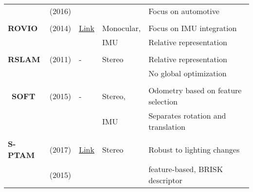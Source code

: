 {\begin{longtable}{l|l|l|l|l}
			& \cite{Buczko2016a} (2016)         &                                                                    &                       & Focus on automotive\\
			&                                   &                                                                    &                       &\\
			\textbf{ROVIO}         & \cite{Bloesch2015} (2014)         & {\href{https://github.com/ethz-asl/rovio}{Link}}                   & Monocular,            & Focus on IMU integration\\
			&                                   &                                                                    & IMU                   & Relative representation\\
			&                                   &                                                                    &                       &\\
			\textbf{RSLAM}         & \cite{Mei2011} (2011)             & -                                                                  & Stereo                & Relative representation\\
			&                                   &                                                                    &                       & No global optimization \\
			&                                   &                                                                    &                       &\\\
			\textbf{SOFT}          & \cite{Cvisic2015} (2015)          & -                                                                  & Stereo,               & Odometry based on feature selection\\
			&                                   &                                                                    & IMU                   & Separates rotation and translation\\
			&                                   &                                                                    &                       &\\
			\textbf{S-PTAM}        & \cite{Pire2017} (2017)            & {\href{https://github.com/lrse/sptam}{Link}}                       & Stereo                & Robust to lighting changes\\
			& \cite{Pire2015} (2015)            &                                                                    &                       & feature-based, BRISK descriptor\\

\end{longtable}}
